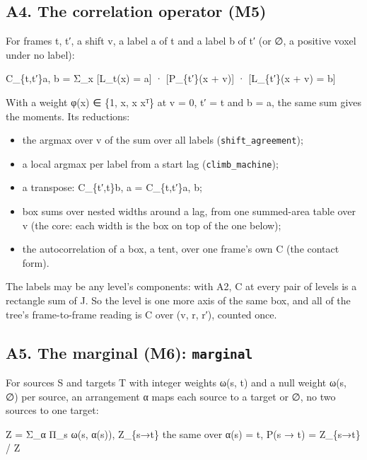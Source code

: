 \subsection{\texorpdfstring{A4. The correlation operator (M5)}{A4. The correlation operator (M5)}}

For frames t, t′, a shift v, a label a of t and a label b of t′ (or ∅, a positive voxel under no label):

C\_\allowbreak{}\{t,t′\}a, b = Σ\_\allowbreak{}x [L\_\allowbreak{}t(x) = a] · [P\_\allowbreak{}\{t′\}(x + v)] · [L\_\allowbreak{}\{t′\}(x + v) = b]

With a weight φ(x) ∈ \{1, x, x xᵀ\} at v = 0, t′ = t and b = a, the same sum gives the moments. Its reductions:

\begin{itemize}
\item the argmax over v of the sum over all labels (\texttt{shift\_\allowbreak{}agreement});
\item a local argmax per label from a start lag (\texttt{climb\_\allowbreak{}machine});
\item a transpose: C\_\allowbreak{}\{t′,t\}b, a = C\_\allowbreak{}\{t,t′\}a, b;
\item box sums over nested widths around a lag, from one summed-area table over v (the core: each width is the box on top of the one below);
\item the autocorrelation of a box, a tent, over one frame's own C (the contact form).
\end{itemize}

The labels may be any level's components: with A2, C at every pair of levels is a rectangle sum of J. So the level is one more axis of the same box, and all of the tree's frame-to-frame reading is C over (v, r, r′), counted once.

\subsection{\texorpdfstring{A5. The marginal (M6): \texttt{marginal}}{A5. The marginal (M6): marginal}}

For sources S and targets T with integer weights ω(s, t) and a null weight ω(s, ∅) per source, an arrangement α maps each source to a target or ∅, no two sources to one target:

Z = Σ\_\allowbreak{}α Π\_\allowbreak{}s ω(s, α(s)),  Z\_\allowbreak{}\{s→t\} the same over α(s) = t,  P(s → t) = Z\_\allowbreak{}\{s→t\} / Z

